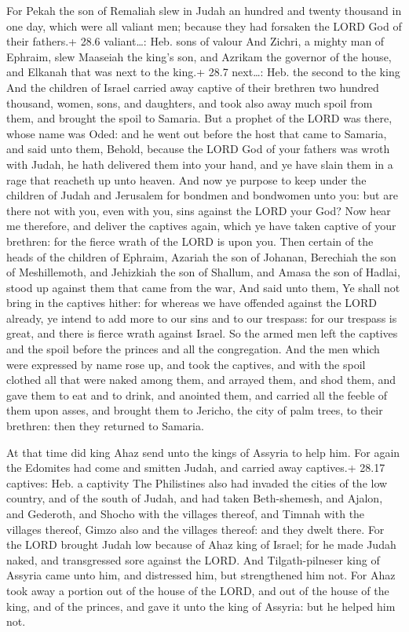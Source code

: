  For Pekah the son of Remaliah slew in Judah an hundred
and twenty thousand in one day, which were all valiant men; because they
had forsaken the LORD God of their fathers.+ 28.6 valiant\ldots: Heb.
sons of valour  And Zichri, a mighty man of Ephraim, slew
Maaseiah the king's son, and Azrikam the governor of the house, and
Elkanah that was next to the king.+ 28.7 next\ldots: Heb. the second to
the king  And the children of Israel carried away captive of
their brethren two hundred thousand, women, sons, and daughters, and
took also away much spoil from them, and brought the spoil to Samaria.
 But a prophet of the LORD was there, whose name was Oded:
and he went out before the host that came to Samaria, and said unto
them, Behold, because the LORD God of your fathers was wroth with Judah,
he hath delivered them into your hand, and ye have slain them in a rage
that reacheth up unto heaven.  And now ye purpose to keep
under the children of Judah and Jerusalem for bondmen and bondwomen unto
you: but are there not with you, even with you, sins against the LORD
your God?  Now hear me therefore, and deliver the captives
again, which ye have taken captive of your brethren: for the fierce
wrath of the LORD is upon you.  Then certain of the heads
of the children of Ephraim, Azariah the son of Johanan, Berechiah the
son of Meshillemoth, and Jehizkiah the son of Shallum, and Amasa the son
of Hadlai, stood up against them that came from the war, 
And said unto them, Ye shall not bring in the captives hither: for
whereas we have offended against the LORD already, ye intend to add more
to our sins and to our trespass: for our trespass is great, and there is
fierce wrath against Israel.  So the armed men left the
captives and the spoil before the princes and all the congregation.
 And the men which were expressed by name rose up, and took
the captives, and with the spoil clothed all that were naked among them,
and arrayed them, and shod them, and gave them to eat and to drink, and
anointed them, and carried all the feeble of them upon asses, and
brought them to Jericho, the city of palm trees, to their brethren: then
they returned to Samaria.

 At that time did king Ahaz send unto the kings of
Assyria to help him.  For again the Edomites had come and
smitten Judah, and carried away captives.+ 28.17 captives: Heb. a
captivity  The Philistines also had invaded the cities of
the low country, and of the south of Judah, and had taken Beth-shemesh,
and Ajalon, and Gederoth, and Shocho with the villages thereof, and
Timnah with the villages thereof, Gimzo also and the villages thereof:
and they dwelt there.  For the LORD brought Judah low
because of Ahaz king of Israel; for he made Judah naked, and
transgressed sore against the LORD.  And Tilgath-pilneser
king of Assyria came unto him, and distressed him, but strengthened him
not.  For Ahaz took away a portion out of the house of the
LORD, and out of the house of the king, and of the princes, and gave it
unto the king of Assyria: but he helped him not.

